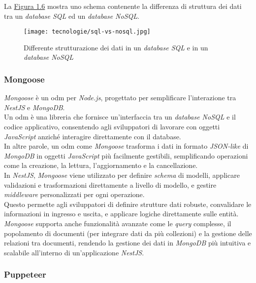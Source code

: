 \noindent La {\hyperref[fig:sql-nosql]{Figura 1.6}} mostra uno schema contenente la differenza di struttura dei dati tra un \textit{database SQL} ed un \textit{database NoSQL}.

\begin{figure}[H]
    \label{fig:sql-nosql}
    \centering
    \texttt{[image: tecnologie/sql-vs-nosql.jpg]}
    \caption{Differente strutturazione dei dati in un \textit{database SQL} e in un \textit{database NoSQL}}
    \cite{site:sql-nosql}
\end{figure}

\pagebreak
\subsubsection{Mongoose}

\textit{Mongoose} è un \gls{odm} per \textit{Node.js}, progettato per semplificare l'interazione tra \textit{NestJS} e \textit{MongoDB}. \\
Un \gls{odm} è una libreria che fornisce un'interfaccia tra un \textit{database NoSQL} e il codice applicativo, consentendo agli sviluppatori di lavorare con oggetti \textit{JavaScript} anziché interagire direttamente con il database. \\
In altre parole, un \gls{odm} come \textit{Mongoose} trasforma i dati in formato \textit{JSON-like} di \textit{MongoDB} in oggetti \textit{JavaScript} più facilmente gestibili, semplificando operazioni come la creazione, la lettura, l'aggiornamento e la cancellazione.\\

\noindent In \textit{NestJS}, \textit{Mongoose} viene utilizzato per definire \textit{schema} di modelli, applicare validazioni e trasformazioni direttamente a livello di modello, e gestire \textit{middleware} personalizzati per ogni operazione.\\
Questo permette agli sviluppatori di definire strutture dati robuste, convalidare le informazioni in ingresso e uscita, e applicare logiche direttamente sulle entità. \\
\textit{Mongoose} supporta anche funzionalità avanzate come le \textit{query} complesse, il popolamento di documenti (per integrare dati da più collezioni) e la gestione delle relazioni tra documenti, rendendo la gestione dei dati in \textit{MongoDB} più intuitiva e scalabile all'interno di un'applicazione \textit{NestJS}.

\subsubsection{Puppeteer}

